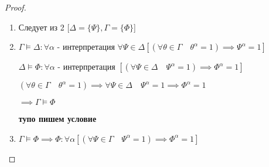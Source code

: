 \documentclass[a4paper]{article}
\theoremstyle{definition}
\theoremstyle{remark}
\begin{document}
    \begin{proof}
        \begin{enumerate}
            \item Следует из 2 [$\Delta= \{ \Psi\}, \Gamma = \{\Phi \}  $]
            \item $\Gamma \models \Delta: \forall \alpha$ - интерпретация $\forall \Psi \in \Delta [(\forall \theta \in \Gamma \quad \theta^\alpha = 1)\implies \Psi^\alpha = 1]$
            
            $\Delta \models \Phi: \forall \alpha$ - интерпретация $[(\forall \Psi \in \Delta \quad \Psi^\alpha = 1)\implies \Phi^\alpha = 1]$

            $(\forall \theta \in \Gamma \quad \theta^\alpha = 1)\implies \forall \Psi \in \Delta \quad \Psi^\alpha = 1\implies \Phi^\alpha = 1$

            $\implies \Gamma \models \Phi$

            \textbf{тупо пишем условие}
            \item $\Gamma \models \Phi\implies \Phi: \forall \alpha [(\forall \Psi \in \Gamma \quad \Psi^\alpha = 1)\implies \Phi^\alpha = 1]$
            

\end{enumerate}
\end{proof}
\end{document}
